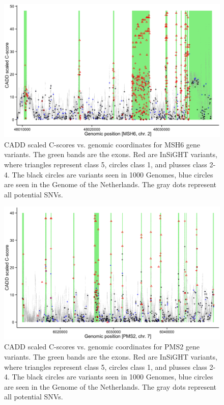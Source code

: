 \begin{figure}
\centering
\includegraphics[width=1.0\linewidth]{img/caddmmr_msh6}
\caption[CADD scaled C-scores for MSH6 gene]{CADD scaled C-scores vs. genomic coordinates for MSH6 gene variants. The green bands are the exons. Red are InSiGHT variants, where triangles represent class 5, circles class 1, and plusses class 2-4. The black circles are variants seen in 1000 Genomes\cite{McVean_2012}, blue circles are seen in the Genome of the Netherlands\cite{Boomsma_2014,Francioli_2014}. The gray dots represent all potential SNVs.}
\label{fig:caddmmr_msh6}
\end{figure}

\begin{figure}
\centering
\includegraphics[width=1.0\linewidth]{img/caddmmr_pms2}
\caption[CADD scaled C-scores for PMS2 gene]{CADD scaled C-scores vs. genomic coordinates for PMS2 gene variants. The green bands are the exons. Red are InSiGHT variants, where triangles represent class 5, circles class 1, and plusses class 2-4. The black circles are variants seen in 1000 Genomes\cite{McVean_2012}, blue circles are seen in the Genome of the Netherlands\cite{Boomsma_2014,Francioli_2014}. The gray dots represent all potential SNVs.}
\label{fig:caddmmr_pms2}
\end{figure}



